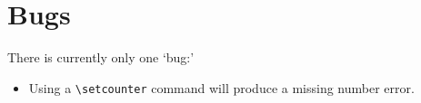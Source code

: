 \documentclass[10pt,a4paper,final,makeidx,twosides]{article}
\begin{document}

%

\section{Bugs}
There is currently only one `bug:'
\begin{itemize}
 \item Using a \verb|\setcounter| command will produce a missing number error.
\end{itemize}
\end{document}
